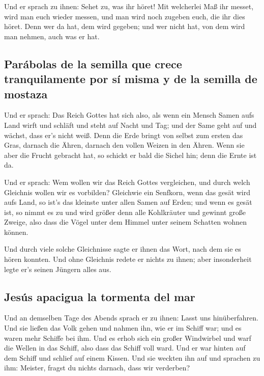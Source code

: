  Und er sprach zu ihnen: Sehet zu, was ihr höret! Mit
welcherlei Maß ihr messet, wird man euch wieder messen, und man wird
noch zugeben euch, die ihr dies höret.  Denn wer da hat,
dem wird gegeben; und wer nicht hat, von dem wird man nehmen, auch was
er hat.

\hypertarget{paruxe1bolas-de-la-semilla-que-crece-tranquilamente-por-suxed-misma-y-de-la-semilla-de-mostaza}{%
\subsection{Parábolas de la semilla que crece tranquilamente por sí
misma y de la semilla de
mostaza}\label{paruxe1bolas-de-la-semilla-que-crece-tranquilamente-por-suxed-misma-y-de-la-semilla-de-mostaza}}

 Und er sprach: Das Reich Gottes hat sich also, als wenn
ein Mensch Samen aufs Land wirft  und schläft und steht
auf Nacht und Tag; und der Same geht auf und wächst, dass er's nicht
weiß.  Denn die Erde bringt von selbst zum ersten das
Gras, darnach die Ähren, darnach den vollen Weizen in den Ähren.
 Wenn sie aber die Frucht gebracht hat, so schickt er
bald die Sichel hin; denn die Ernte ist da.

 Und er sprach: Wem wollen wir das Reich Gottes
vergleichen, und durch welch Gleichnis wollen wir es vorbilden?
 Gleichwie ein Senfkorn, wenn das gesät wird aufs Land,
so ist's das kleinste unter allen Samen auf Erden;  und
wenn es gesät ist, so nimmt es zu und wird größer denn alle Kohlkräuter
und gewinnt große Zweige, also dass die Vögel unter dem Himmel unter
seinem Schatten wohnen können.

 Und durch viele solche Gleichnisse sagte er ihnen das
Wort, nach dem sie es hören konnten.  Und ohne Gleichnis
redete er nichts zu ihnen; aber insonderheit legte er's seinen Jüngern
alles aus.

\hypertarget{jesuxfas-apacigua-la-tormenta-del-mar}{%
\subsection{Jesús apacigua la tormenta del
mar}\label{jesuxfas-apacigua-la-tormenta-del-mar}}

 Und an demselben Tage des Abends sprach er zu ihnen:
Lasst uns hinüberfahren.  Und sie ließen das Volk gehen
und nahmen ihn, wie er im Schiff war; und es waren mehr Schiffe bei ihm.
 Und es erhob sich ein großer Windwirbel und warf die
Wellen in das Schiff, also dass das Schiff voll ward. 
Und er war hinten auf dem Schiff und schlief auf einem Kissen. Und sie
weckten ihn auf und sprachen zu ihm: Meister, fragst du nichts darnach,
dass wir verderben?

